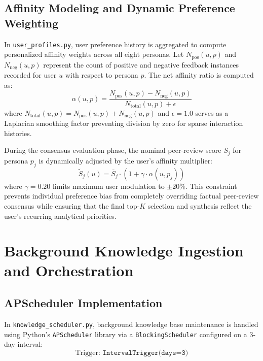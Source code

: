 \subsection{Affinity Modeling and Dynamic Preference Weighting}
In \texttt{user\_profiles.py}, user preference history is aggregated to compute personalized affinity weights across all eight personas. Let $N_{\text{pos}}(u, p)$ and $N_{\text{neg}}(u, p)$ represent the count of positive and negative feedback instances recorded for user $u$ with respect to persona $p$. The net affinity ratio is computed as:
\begin{equation}
\label{eq:user_affinity}
\alpha(u, p) = \frac{N_{\text{pos}}(u, p) - N_{\text{neg}}(u, p)}{N_{\text{total}}(u, p) + \epsilon}
\end{equation}
where $N_{\text{total}}(u, p) = N_{\text{pos}}(u, p) + N_{\text{neg}}(u, p)$ and $\epsilon = 1.0$ serves as a Laplacian smoothing factor preventing division by zero for sparse interaction histories.

During the consensus evaluation phase, the nominal peer-review score $\bar{S}_j$ for persona $p_j$ is dynamically adjusted by the user's affinity multiplier:
\begin{equation}
\label{eq:personalized_score}
\tilde{S}_j(u) = \bar{S}_j \cdot \left( 1 + \gamma \cdot \alpha(u, p_j) \right)
\end{equation}
where $\gamma = 0.20$ limits maximum user modulation to $\pm 20\%$. This constraint prevents individual preference bias from completely overriding factual peer-review consensus while ensuring that the final top-$K$ selection and synthesis reflect the user's recurring analytical priorities.

\section{Background Knowledge Ingestion and Orchestration}
\label{sec:scheduler_orchestration}

\subsection{APScheduler Implementation}
In \texttt{knowledge\_scheduler.py}, background knowledge base maintenance is handled using Python's \texttt{APScheduler} library via a \texttt{BlockingScheduler} configured on a 3-day interval:
\begin{equation}
\text{Trigger: } \texttt{IntervalTrigger(days=3)}
\end{equation}

